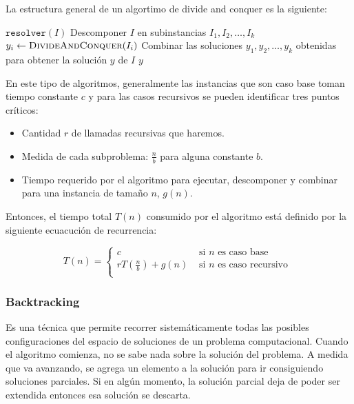 La estructura general de un algortimo de divide and conquer es la siguiente:

\begin{algorithmic}
		\Return \(\texttt{resolver}(I)\)
	\Else
		\State Descomponer \(I\) en subinstancias \(I_1, I_2,\dots, I_k\)
			\State \(y_i \gets \Call{DivideAndConquer}{I_i}\)
		\EndFor
		\State Combinar las soluciones \(y_1, y_2,\dots, y_k\) obtenidas para obtener la solución \(y\) de \(I\)
		\State\Return \(y\)
	\EndIf

	\EndFunction
\end{algorithmic}

En este tipo de algoritmos, generalmente las instancias que son caso base toman tiempo constante \(c\) y para las casos recursivos se pueden identificar tres puntos críticos:
\begin{itemize}
	\item Cantidad $r$ de llamadas recursivas que haremos.
	\item Medida de cada subproblema: \(\frac{n}{b}\) para alguna constante \(b\).
	\item Tiempo requerido por el algoritmo para ejecutar, descomponer y combinar para una instancia de tamaño \(n\), \(g(n)\).
\end{itemize}

Entonces, el tiempo total \(T(n)\) consumido por el algoritmo está definido por la siguiente ecuacución de recurrencia:

\[ T(n) = \begin{cases} 
c & \text{ si } n \text{ es caso base }\\
rT\left(\frac{n}{b}\right) + g(n) & \text{ si } n \text{ es caso recursivo } \\
\end{cases}
\]

\subsubsection{Backtracking}
Es una técnica que permite recorrer sistemáticamente todas las posibles configuraciones del espacio de soluciones de un problema computacional. Cuando el algoritmo comienza, no se sabe nada sobre la solución del problema. A medida que va avanzando, se agrega un elemento a la solución para ir consiguiendo soluciones parciales. Si en algún momento, la solución parcial deja de poder ser extendida entonces esa solución se descarta.


